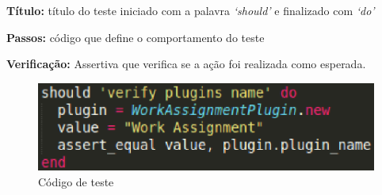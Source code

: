 \textbf{Título:} título do teste iniciado com a palavra \textit{‘should’} e finalizado com \textit{‘do’}

\textbf{Passos:} código que define o comportamento do teste

\textbf{Verificação:} Assertiva que verifica se a ação foi realizada como esperada.

\begin{figure}[!h]
    \centering
    \includegraphics[keepaspectratio=true,scale=0.55]
      {figuras/teste_should.eps}
    \caption{Código de teste}
    \label{noosfero_should}
\end{figure}

